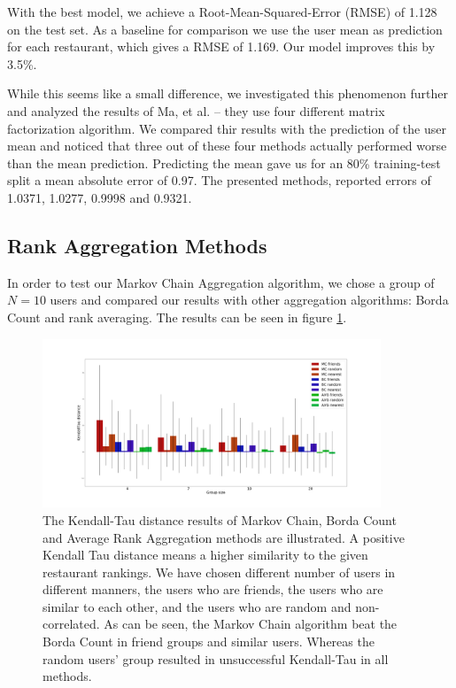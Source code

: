 \documentclass[a4paper]{article}
\begin{document}
With the best model, we achieve a Root-Mean-Squared-Error (RMSE) of 1.128 on the test set.
As a baseline for comparison we use the user mean as prediction for each restaurant, which gives a RMSE of 1.169. Our model improves this by 3.5\%.

While this seems like a small difference, we investigated this phenomenon further and analyzed the  results of Ma, et al. \cite{Ma08} -- they use four different matrix factorization algorithm. We compared thir results with the prediction of the user mean and noticed that three out of these four methods actually performed worse than the mean prediction. Predicting the mean gave us for an 80\% training-test split a mean absolute error of 0.97. The presented methods, reported errors of 1.0371, 1.0277, 0.9998 and 0.9321.


\subsection{Rank Aggregation Methods}

In order to test our Markov Chain Aggregation algorithm, we chose a group of $N=10$ users and compared our results with other aggregation algorithms: Borda Count and rank averaging. The results can be seen in figure \ref{fig:kendalltau}. 

\begin{figure}[h]
\centering
\includegraphics[width=0.9\textwidth]{kendalltau.png}
\caption{\label{fig:kendalltau}The Kendall-Tau distance results of Markov Chain, Borda Count and Average Rank Aggregation methods are illustrated. A positive Kendall Tau distance means a higher similarity to the given restaurant rankings. We have chosen different number of users in different manners, the users who are friends, the users who are similar to each other, and the users who are random and non-correlated. As can be seen, the Markov Chain algorithm beat the Borda Count in friend groups and similar users. Whereas the random users' group resulted in unsuccessful Kendall-Tau in all methods.}
\end{figure}
\end{document}
